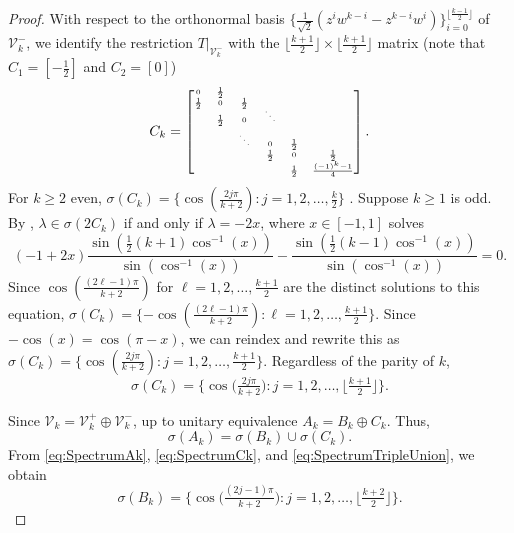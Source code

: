 \documentclass[10pt,reqno]{amsart}
\newcommand{\0}{{\color{lightgray}0}}
\renewcommand{\geq}{\geqslant}
\newcommand{\V}{\mathcal{V}}
\theoremstyle{definition}
\numberwithin{equation}{section}
\begin{document}
\begin{proof}
With respect to the orthonormal basis $\{\frac{1}{\sqrt{2}}(z^i w^{k-i} - z^{k-i} w^i)\}_{i=0}^{\lfloor \frac{k-1}{2}\rfloor}$ of
$\V_k^-$, we identify the restriction $T|_{ \V_{k}^- }$ with the $\lfloor \frac{k+1}{2}\rfloor \times \lfloor \frac{k+1}{2}\rfloor$
matrix (note that $C_1 = [- \frac{1}{2}]$ and $C_2 = [0]$)
\begin{equation*}
C_k = \tiny
    \begin{bmatrix}
0 & \frac{1}{2} &  &  &  & \\
\frac{1}{2} & 0 & \frac{1}{2} &  &  &\\[-5pt]
 & \frac{1}{2} & 0 & \ddots &  &\\
 &  & \ddots & 0 &  \frac{1}{2} &\\
 &  &  & \frac{1}{2} & 0 &\frac{1}{2}\\[1pt]
  &  &  &  &\frac{1}{2} & \frac{(-1)^k - 1}{4}
\end{bmatrix}.
\end{equation*}
For $k\geq 2$ even, 
$\sigma (C_k) =  \{ \cos(\frac{2j \pi}{  k+2} )  : j = 1,2, \ldots, \frac{k}{2} \}$ \cite[Prop.~2.1]{tridiageigen}.
Suppose $k\geq 1$ is odd.
By \cite[eq.~11]{tridiageigen}, $\lambda \in \sigma( 2 C_k)$ if and only if $\lambda =  -2 x $, where 
$x\in[-1,1]$ solves
\begin{equation*}
    (-1 + 2x) \frac{\sin (\frac{1}{2}(k+1) \cos ^{-1}(x))}{\sin (\cos ^{-1} (x))} - \frac{\sin (\frac{1}{2}(k-1) \cos ^{-1}(x))}{\sin (\cos ^{-1} (x))}  = 0.
\end{equation*}
Since $\cos(\frac{(2\ell -1 )\pi}{k+2})$ for $\ell = 1,2, \ldots,\frac{k+1}{2}$
are the distinct solutions to this equation,
$\sigma( C_k) =\{  - \cos(\frac{(2\ell - 1)\pi}{k+2}) : \ell = 1,2,  \ldots,\frac{k+1}{2} \}$.
Since $- \cos{(x)} = \cos{ (\pi - x)}$, we can reindex and rewrite this as
$\sigma (C_k) =   \{ \cos(\tfrac{2j \pi}{k+2}) : j = 1,2,  \ldots,\tfrac{k+1}{2} \}$.
Regardless of the parity of $k$, 
\begin{equation}\label{eq:SpectrumCk}
    \sigma (C_k) = \big\{ \cos \! \big(  \tfrac{2j \pi} { k+2} \big)  : j = 1,2, \ldots, \big\lfloor \tfrac{k+1}{2} \big\rfloor \big\}.
\end{equation}

Since $\mathcal{V}_k=\V_{k}^+ \oplus\V_{k}^- $, up to unitary equivalence $A_k = B_k \oplus C_k$.  Thus,
\begin{equation}\label{eq:SpectrumTripleUnion}
    \sigma (A_k) = \sigma (B_k) \cup \sigma (C_k).
\end{equation}
From \eqref{eq:SpectrumAk}, \eqref{eq:SpectrumCk}, and \eqref{eq:SpectrumTripleUnion}, we obtain
\begin{equation}\label{specBk}
    \sigma (B_k) = \big\{ \cos\! \big(  \tfrac{(2j-1) \pi} { k+2} \big)  : j = 1,2, \ldots, \big\lfloor \tfrac{k+2}{2} \big\rfloor \big\}. 
\end{equation}


\end{proof}
\end{document}
